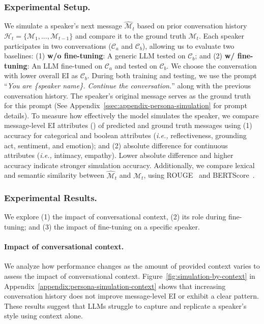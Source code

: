 \subsubsection{Experimental Setup.}
We simulate a speaker’s next message \(\hat{\mathcal{M}}_t\) based on prior conversation history \(\mathcal{H}_t = \{\mathcal{M}_1, ..., \mathcal{M}_{t-1}\}\) and compare it to the ground truth \(\mathcal{M}_t\).
Each speaker participates in two conversations (\(\mathcal{C}_a\) and \(\mathcal{C}_b\)), allowing us to evaluate two baselines:  
(1) \textbf{w/o fine-tuning}: A generic LLM tested on \(\mathcal{C}_b\); and
(2) \textbf{w/ fine-tuning}: An LLM fine-tuned on \(\mathcal{C}_a\) and tested on \(\mathcal{C}_b\).
We choose the conversation with lower overall EI as \(\mathcal{C}_b\).
During both training and testing, we use the prompt ``\textit{You are \{speaker name\}. Continue the conversation.}'' along with the previous conversation history.
The speaker’s original message serves as the ground truth for this prompt (See Appendix~\ref{ssec:appendix-persona-simulation} for prompt details).
To measure how effectively the model simulates the speaker, we compare message-level EI attributes () of predicted and ground truth messages using  
(1) accuracy for categorical and boolean attributes (\textit{i.e.,} reflectiveness, grounding act, sentiment, and emotion); and  
(2) absolute difference for continuous attributes (\textit{i.e.,} intimacy, empathy).
Lower absolute difference and higher accuracy indicate stronger simulation accuracy.  
Additionally, we compare lexical and semantic similarity between \(\hat{\mathcal{M}}_t\) and \(\mathcal{M}_t\), using ROUGE~\cite{lin-2004-rouge} and BERTScore~\cite{Zhang*2020BERTScore:}.

\subsubsection{Experimental Results.}
We explore (1) the impact of conversational context, (2) its role during fine-tuning; and (3) the impact of fine-tuning on a specific speaker.

\paragraph{Impact of conversational context.}  
We analyze how performance changes as the amount of provided context varies to assess the impact of conversational context.
Figure~\ref{fig:simulation-by-context} in Appendix~\ref{appendix:persona-simulation-context} shows that increasing conversation history does not improve message-level EI or exhibit a clear pattern.  
These results suggest that LLMs struggle to capture and replicate a speaker’s style using context alone. 



